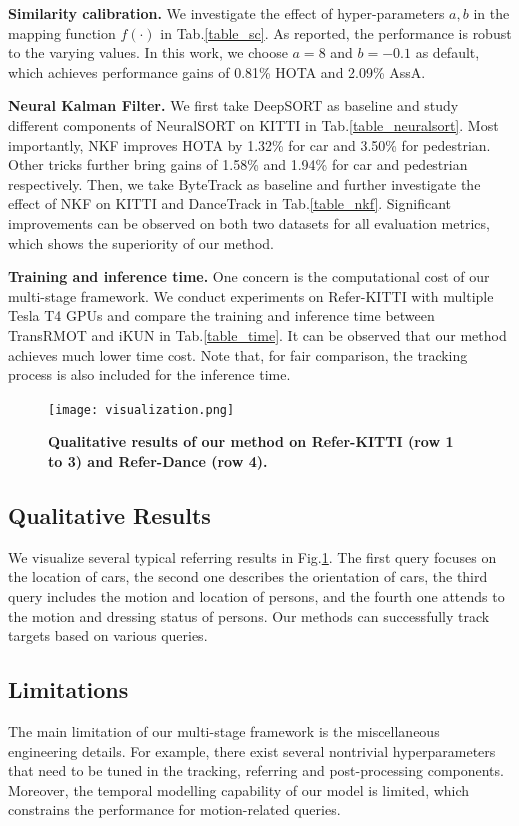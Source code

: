 \documentclass[10pt,twocolumn,letterpaper]{article}
\begin{document}
    \noindent\textbf{Similarity calibration.}
    We investigate the effect of hyper-parameters $a, b$ in the mapping function $f(\cdot)$ in Tab.\ref{table_sc}.
    As reported, the performance is robust to the varying values.
    In this work, we choose $a = 8$ and $b = -0.1$ as default,
    which achieves performance gains of 0.81\% HOTA and 2.09\% AssA.
 
    \noindent\textbf{Neural Kalman Filter.}
    We first take DeepSORT as baseline and study different components of NeuralSORT on KITTI in Tab.\ref{table_neuralsort}.
    Most importantly, NKF improves HOTA by 1.32\% for car and 3.50\% for pedestrian.
    Other tricks further bring gains of 1.58\% and 1.94\% for car and pedestrian respectively.
    Then, we take ByteTrack as baseline and further investigate the effect of NKF on KITTI and DanceTrack in Tab.\ref{table_nkf}.
    Significant improvements can be observed on both two datasets for all evaluation metrics,
    which shows the superiority of our method.

    \noindent\textbf{Training and inference time.}
    One concern is the computational cost of our multi-stage framework.
    We conduct experiments on Refer-KITTI with multiple Tesla T4 GPUs and compare the training and inference time between TransRMOT and iKUN in Tab.\ref{table_time}.
    It can be observed that our method achieves much lower time cost.
    Note that, for fair comparison, the tracking process is also included for the inference time.

\begin{figure}[h]
    \centering
    \texttt{[image: visualization.png]}
    \caption{
        \textbf{Qualitative results of our method on Refer-KITTI (row 1 to 3) and Refer-Dance (row 4).}
    }
    \label{fig_7}
\end{figure}

\subsection{Qualitative Results}
    We visualize several typical referring results in Fig.\ref{fig_7}.
    The first query focuses on the location of cars, the second one describes the orientation of cars, the third query includes the motion and location of persons,
    and the fourth one attends to the motion and dressing status of persons.
    Our methods can successfully track targets based on various queries.

\subsection{Limitations}
    The main limitation of our multi-stage framework is the miscellaneous engineering details.
    For example, there exist several nontrivial hyperparameters that need to be tuned in the tracking, referring and post-processing components.
    Moreover, the temporal modelling capability of our model is limited, which constrains the performance for motion-related queries.
\end{document}
